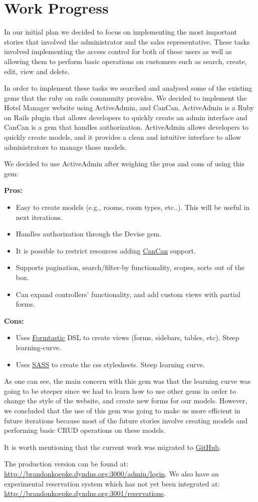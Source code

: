 \section{Work Progress}

In our initial plan we decided to focus on implementing the most important stories that   involved the administrator and the sales representative. These tasks involved implementing the access control for both of these users as well as allowing them to perform basic operations on customers such as search, create, edit, view and delete.

In order to implement these tasks we searched and analysed some of the existing gems that the ruby on rails community provides. We decided to implement the Hotel Manager website using ActiveAdmin, and CanCan. ActiveAdmin is a Ruby on Rails plugin that allows developers to quickly create an admin interface and CanCan is a gem that handles authorization.  ActiveAdmin allows developers to quickly create models, and it provides a clean and intuitive interface to allow administrators to manage those models.

We decided to use ActiveAdmin after weighing the pros and cons of using this gem:

\textbf{Pros:}
\begin{itemize}
	\item Easy to create models (e.g., rooms, room types, etc..). This will be useful in next iterations.
	\item Handles authorization through the Devise gem.
	\item It is possible to restrict resources adding \href{https://github.com/ryanb/cancan}{CanCan} support.
	\item Supports pagination, search/filter-by functionality, scopes, sorts out of the box.
	\item Can expand controllers' functionality, and add custom views with partial forms. 
\end{itemize}
\textbf{Cons:}
\begin{itemize}
	\item Uses \href{https://github.com/justinfrench/formtastic}{Formtastic} DSL to create views (forms, sidebars, tables, etc). Steep learning-curve.
	\item Uses \href{http://sass-lang.com}{SASS} to create the css stylesheets. Steep learning curve.
\end{itemize}
As one can see, the main concern with this gem was that the learning curve was going to be steeper since we had to learn how to use other gems in order to change the style of the website, and create new forms for our models. However, we concluded that the use of this gem was going to make us more efficient in future iterations because most of the future stories involve creating models and performing basic CRUD operations on these models.

It is worth mentioning that the current work was migrated to \href{https://github.com/bdkoepke/hotelmanager}{GitHub}.

The production version can be found at: \url{http://brandonkoepke.dyndns.org:3000/admin/login}. We also have an experimental reservation system which has not yet been integrated at: \url{http://brandonkoepke.dyndns.org:3001/reservations}.
